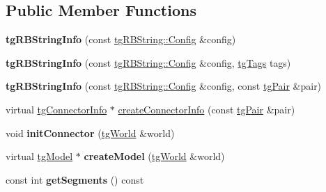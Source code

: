 \subsection*{Public Member Functions}
\begin{DoxyCompactItemize}
\item 
\hypertarget{classtg_r_b_string_info_adcfc641a7ae1d70ea362f0dfa8e13917}{{\bfseries tg\-R\-B\-String\-Info} (const \hyperlink{structtg_r_b_string_1_1_config}{tg\-R\-B\-String\-::\-Config} \&config)}\label{classtg_r_b_string_info_adcfc641a7ae1d70ea362f0dfa8e13917}

\item 
\hypertarget{classtg_r_b_string_info_a90ead334fba4e198f451e95429b3abfe}{{\bfseries tg\-R\-B\-String\-Info} (const \hyperlink{structtg_r_b_string_1_1_config}{tg\-R\-B\-String\-::\-Config} \&config, \hyperlink{classtg_tags}{tg\-Tags} tags)}\label{classtg_r_b_string_info_a90ead334fba4e198f451e95429b3abfe}

\item 
\hypertarget{classtg_r_b_string_info_ad41b8e61317c62ade3c11cd8f9f79e6e}{{\bfseries tg\-R\-B\-String\-Info} (const \hyperlink{structtg_r_b_string_1_1_config}{tg\-R\-B\-String\-::\-Config} \&config, const \hyperlink{classtg_pair}{tg\-Pair} \&pair)}\label{classtg_r_b_string_info_ad41b8e61317c62ade3c11cd8f9f79e6e}

\item 
virtual \hyperlink{classtg_connector_info}{tg\-Connector\-Info} $\ast$ \hyperlink{classtg_r_b_string_info_a2e6cdb00b97a3c28a789754f2d79651d}{create\-Connector\-Info} (const \hyperlink{classtg_pair}{tg\-Pair} \&pair)
\item 
\hypertarget{classtg_r_b_string_info_a6bd5aa1297bf6cbe6c6138f9d9ebe2aa}{void {\bfseries init\-Connector} (\hyperlink{classtg_world}{tg\-World} \&world)}\label{classtg_r_b_string_info_a6bd5aa1297bf6cbe6c6138f9d9ebe2aa}

\item 
\hypertarget{classtg_r_b_string_info_a87cd2d36adf7dcb06b2a49e653d190f8}{virtual \hyperlink{classtg_model}{tg\-Model} $\ast$ {\bfseries create\-Model} (\hyperlink{classtg_world}{tg\-World} \&world)}\label{classtg_r_b_string_info_a87cd2d36adf7dcb06b2a49e653d190f8}

\item 
\hypertarget{classtg_r_b_string_info_adb919c64c2d8aa4e3514b88f83a2f5c9}{const int {\bfseries get\-Segments} () const }\label{classtg_r_b_string_info_adb919c64c2d8aa4e3514b88f83a2f5c9}


\end{DoxyCompactItemize}
